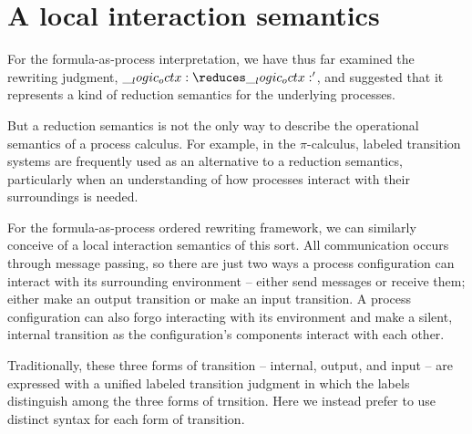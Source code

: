 

\section{A local interaction semantics}\label{sec:formula-as-process:local-interaction}\label{sec:formula-as-process:transition-semantics}

For the formula-as-process interpretation, we have thus far examined the rewriting judgment, $\octx \reduces \octx'$, and suggested that it represents a kind of reduction semantics for the underlying processes.

But a reduction semantics is not the only way to describe the operational semantics of a process calculus.
For example, in the $\pi$-calculus, labeled transition systems are frequently used as an alternative to a reduction semantics, particularly when an understanding of how processes interact with their surroundings is needed.

For the formula-as-process ordered rewriting framework, we can similarly conceive of a local interaction semantics of this sort.
All communication occurs through message passing, so there are just two ways a process configuration can interact with its surrounding environment -- either send messages or receive them; either make an output transition or make an input transition.
A process configuration can also forgo interacting with its environment and make a silent, internal transition as the configuration's components interact with each other.

Traditionally, these three forms of transition -- internal, output, and input -- are expressed with a unified labeled transition judgment in which the labels distinguish among the three forms of trnsition.
Here we instead prefer to use distinct syntax for each form of transition.

